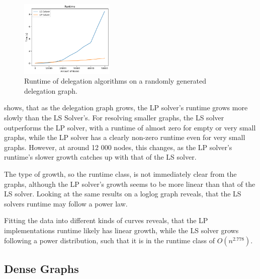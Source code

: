 \begin{figure}[h]
    \centering
    \includegraphics[width=0.4\textwidth]{0-50000_random_no_iterative}
    \caption{Runtime of delegation algorithms on a randomly generated delegation graph.}
    \label{fig:random-large-no-iterative}
\end{figure}

 shows, that as the delegation graph grows, the LP solver's runtime grows more slowly than the LS Solver's. For resolving smaller graphs, the LS solver outperforms the LP solver, with a runtime of almost zero for empty or very small graphs, while the LP solver has a clearly non-zero runtime even for very small graphs. However, at around 12 000 nodes, this changes, as the LP solver's runtime's slower growth catches up with that of the LS solver. 

The type of growth, so the runtime class, is not immediately clear from the graphs, although the LP solver's growth seems to be more linear than that of the LS solver. Looking at the same results on a loglog graph reveals, that the LS solvers runtime may follow a power law.

Fitting the data into different kinds of curves reveals, that the LP implementations runtime likely has linear growth, while the LS solver grows following a power distribution, such that it is in the runtime class of $O(n^{2.778})$.


\subsection{Dense Graphs}


